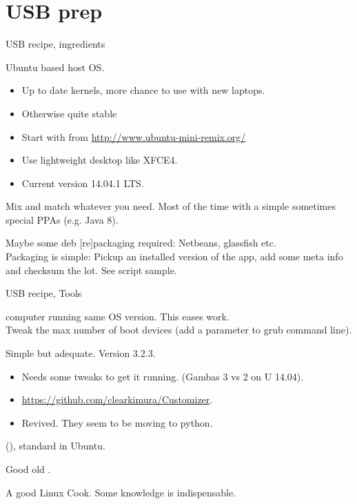 \section{USB prep}
\begin{frame}{USB recipe, ingredients}
  \begin{description}[short]
  \item[Distribution] Ubuntu based host OS.
    \begin{itemize}
    \item Up to date kernels, more chance to use with new laptops.
    \item Otherwise quite stable
    \item Start with  from
      \url{http://www.ubuntu-mini-remix.org/}
    \item Use lightweight desktop like XFCE4.
    \item Current version 14.04.1 LTS.
    \end{itemize}
  \item[Apps]  Mix and match whatever you need. Most of the time with a
    simple  sometimes special PPAs (e.g. Java 8).
  \item[Home grown packages] Maybe some deb [re]packaging required:
    Netbeans, glassfish etc.\\
    Packaging is simple: Pickup an installed version of the app, add some meta
    info and checksum the lot. See script sample.
  \end{description}
\end{frame}

\begin{frame}{USB recipe, Tools}
  \begin{description}[short]
  \item[Host] computer running same OS version. This eases work.\\
    Tweak
    the max number of boot devices (add a parameter to grub command line).
  \item[Customizer] Simple but adequate. Version 3.2.3.
    \begin{itemize}
    \item Needs some tweaks to get it running. (Gambas 3 vs 2 on U 14.04).
    \item \url{https://github.com/clearkimura/Customizer}.
    \item Revived. They seem to be moving to python.
    \end{itemize}
  \item[Startup Disk Creator] (),
    standard in Ubuntu.
  \item[DD] Good old .
  \item[Cook] A good Linux Cook\InlineSmiley. Some knowledge is indispensable.
  \end{description}
\end{frame}

